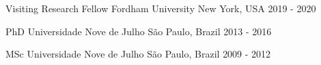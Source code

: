 

\begin{cventries}

  \cventry
    {Visiting Research Fellow} %
    {Fordham University} %
    {New York, USA} %
    {2019 - 2020} %

  \cventry
    {PhD} %
    {Universidade Nove de Julho} %
    {São Paulo, Brazil} %
    {2013 - 2016} %

  \cventry
    {MSc} %
    {Universidade Nove de Julho} %
    {São Paulo, Brazil} %
    {2009 - 2012} %

\end{cventries}
